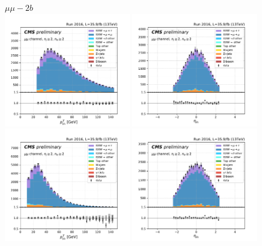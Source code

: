 \begin{figure}[ht]
    \centering
    $\mu\mu - 2b$ \\
    \includegraphics[width=0.49\textwidth]{chapters/Analysis/sectionPlots/figures/kinematics_pickles/mumu/2b/mumu_2b_lepton1_pt.pdf}
    \includegraphics[width=0.49\textwidth]{chapters/Analysis/sectionPlots/figures/kinematics_pickles/mumu/2b/mumu_2b_lepton1_eta.pdf}
    \includegraphics[width=0.49\textwidth]{chapters/Analysis/sectionPlots/figures/kinematics_pickles/mumu/2b/mumu_2b_lepton2_pt.pdf}
    \includegraphics[width=0.49\textwidth]{chapters/Analysis/sectionPlots/figures/kinematics_pickles/mumu/2b/mumu_2b_lepton2_eta.pdf}

\end{figure}
